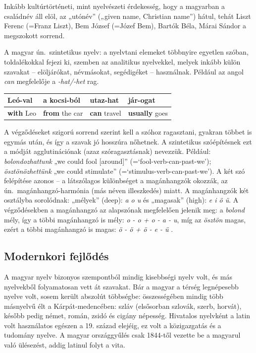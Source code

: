 \begin{multicols}{2}
  Inkább kultúrtörténeti, mint nyelvészeti érdekesség, hogy a magyarban a családnév áll elöl, az „utónév” („given name, Christian name”) hátul, tehát Liszt Ferenc (=Franz Liszt), Bem József (=Józef Bem), Bartók Béla, Márai Sándor a megszokott sorrend.

  A magyar ún.\ szintetikus nyelv: a nyelvtani elemeket többnyire egyetlen szóban, toldalékokkal fejezi ki, szemben az analitikus nyelvekkel, melyek inkább külön szavakat -- elöljárókat, névmásokat, segédigéket -- használnak. Például az angol \textit{can} megfelelője a \textit{-hat/-het} rag.

  \vspace{3mm} 

  \begin{tabular}{l|l|l|l}
      Leó-\textbf{val} & a kocsi-\textbf{ból} & utaz-\textbf{hat} & jár-\textbf{ogat}\\
      \hline
      \textbf{with} Leo & \textbf{from} the car & \textbf{can} travel & \textbf{usually} goes \\
    \end{tabular}

  \vspace{3mm} 

  A végződéseket szigorú sorrend szerint kell a szóhoz ragasztani, gyakran többet is egymás után, és így a szavak jó hosszúra nőhetnek. A szintetikus szóépítésnek ezt a módját agglutinációnak (azaz szóragasztásnak) nevezzük. Például: \textit{bolondozhattunk} „we could fool [around]” (=`fool-verb-can-past-we'); \textit{ösztönözhettünk} „we could stimulate” (=`stimulus-verb-can-past-we'). A két szó felépítése azonos -- a látszólagos különbséget a magánhangzók okozzák, az ún.\ magánhangzó-harmónia (más néven illeszkedés) miatt. A magánhangzók két osztályba sorolódnak: „mélyek” (deep): \textit{a o u} és „magasak” (high): \textit{e i ö ü}. A végződésekben a magánhangzó az alapszónak megfelelően jelenik meg: a \textit{bolond} mély, így a többi magánhangzó is mély: \textit{o - o + o - a - u}, míg az \textit{ösztön} magas, ezért a többi magánhangzó is magas: \textit{ö - ö + ö - e - ü} \cite{didyouknow1}.

  \subsection{Modernkori fejlődés}

  A magyar nyelv bizonyos szempontból mindig kisebbségi nyelv volt, és más nyelvekből folyamatosan vett át szavakat. Bár a magyar a térség legnépesebb nyelve volt, sosem került abszolút többségbe: összességében mindig több másnyelvű élt a Kárpát-medencében: szláv (elsősorban szlovák, szerb, horvát), később pedig német, román, zsidó és cigány népesség. Hivatalos nyelvként a latin volt használatos egészen a 19. század elejéig, ez volt a közigazgatás és a tudomány nyelve. A magyar országgyűlés csak 1844-től vezette be a magyarul való ülésezést, addig latinul folyt a vita. 


\end{multicols}
